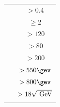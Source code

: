 \begin{figure}[!htb]
\begin{minipage}[!htb]{.5\textwidth}
\begin{tabular}{lc}
							   \toprule
							   \dphijetthreemet  & $>0.4$             \\ %
							   \nBJet   & $\geq$2            \\     %
							   \mantikteightzero & $>120$ \gev        \\     %
							   \mantikteightone  & $>80$ \gev         \\     %
							   \mtbmin\          & $>200$ \gev        \\     %
							   \met\             & $> 550 \gev$       \\     %
							   \HT               & $>800 \gev$        \\     %
							   \htsig            & $> 18 \sqrt{\GeV}$ \\     
							   \bottomrule
							   \label{tab:SignalRegionE}
							\end{tabular}
					\end{minipage}
				\end{figure}

